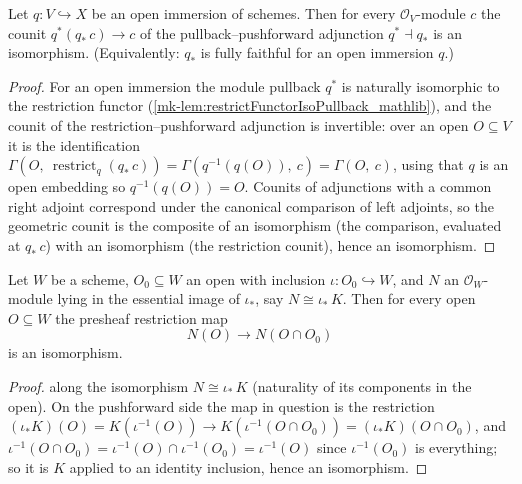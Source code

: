 \begin{lemma}\label{mk-lem:openimm_pullback_counit_isIso}
  \leanok

  Let \(q : V \hookrightarrow X\) be an open immersion of schemes.  Then for every
  \(\mathcal{O}_V\)-module \(c\) the counit \(q^*(q_*\,c) \to c\) of the pullback--pushforward
  adjunction \(q^* \dashv q_*\) is an isomorphism.  (Equivalently: \(q_*\) is fully faithful for
  an open immersion \(q\).)
\end{lemma}
\begin{proof}
  \leanok{}
  For an open immersion the module pullback \(q^*\) is naturally isomorphic to the restriction
  functor (\ref{mk-lem:restrictFunctorIsoPullback_mathlib}), and the counit of the
  restriction--pushforward adjunction is invertible: over an open \(O \subseteq V\) it is the
  identification \(\Gamma(O,\ \operatorname{restrict}_q (q_*\,c)) = \Gamma(q^{-1}(q(O)),\ c) =
  \Gamma(O,\ c)\), using that \(q\) is an open embedding so \(q^{-1}(q(O)) = O\).  Counits of
  adjunctions with a common right adjoint correspond under the canonical comparison of left
  adjoints, so the geometric counit is the composite of an isomorphism (the comparison, evaluated
  at \(q_*\,c\)) with an isomorphism (the restriction counit), hence an isomorphism.
\end{proof}

\begin{lemma}\label{mk-lem:restrictionMap_isIso_of_essImage}
  \leanok

  Let \(W\) be a scheme, \(O_0 \subseteq W\) an open with inclusion \(\iota : O_0 \hookrightarrow
  W\), and \(N\) an \(\mathcal{O}_W\)-module lying in the essential image of \(\iota_*\), say
  \(N \cong \iota_*\,K\).  Then for every open \(O \subseteq W\) the presheaf restriction map
  \[
    N(O) \longrightarrow N(O \cap O_0)
  \]
  is an isomorphism.
\end{lemma}
\begin{proof}
  \leanokTransport along the isomorphism \(N \cong \iota_*\,K\) (naturality of its components in the
  open).  On the pushforward side the map in question is the restriction
  \((\iota_*K)(O) = K(\iota^{-1}(O)) \to K(\iota^{-1}(O \cap O_0)) = (\iota_*K)(O \cap O_0)\),
  and \(\iota^{-1}(O \cap O_0) = \iota^{-1}(O) \cap \iota^{-1}(O_0) = \iota^{-1}(O)\) since
  \(\iota^{-1}(O_0)\) is everything; so it is \(K\) applied to an identity inclusion, hence an
  isomorphism.
\end{proof}

